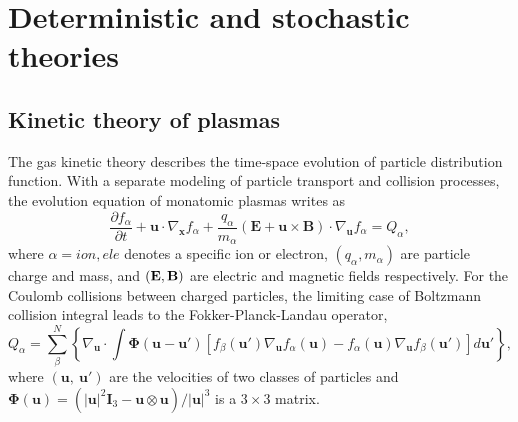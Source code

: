 \documentclass[preprint,3p,12pt,sort&compress]{elsarticle}
\begin{document}
\section{Deterministic and stochastic theories}\label{sec:kinetic theory}

\subsection{Kinetic theory of plasmas}

The gas kinetic theory describes the time-space evolution of particle distribution function.
With a separate modeling of particle transport and collision processes, the evolution equation of monatomic plasmas writes as
\begin{equation}
\frac{\partial f_{\alpha}}{\partial t}+\mathbf{u} \cdot \nabla_{\mathbf{x}} f_{\alpha}+\frac{q_{\alpha}}{m_{\alpha}}\left(\mathbf{E}+\mathbf{u} \times \mathbf{B}\right) \cdot \nabla_{\mathbf{u}} f_{\alpha}=Q_{\alpha},
\label{eqn:boltzmann}
\end{equation}
where $\alpha = ion,ele$ denotes a specific ion or electron, $(q_\alpha, m_\alpha)$ are particle charge and mass, and $(\bf E, B)$ are electric and magnetic fields respectively.
For the Coulomb collisions between charged particles, the limiting case of Boltzmann collision integral leads to the Fokker-Planck-Landau operator,
\begin{equation}
Q_\alpha = \sum_\beta^N \left\{ \nabla_\mathbf u \cdot \int \mathbf \Phi(\mathbf u - \mathbf u') \left[ f_\beta(\mathbf u') \nabla_\mathbf u f_\alpha(\mathbf u) - f_\alpha(\mathbf u) \nabla_\mathbf u f_\beta(\mathbf u') \right] d\mathbf u' \right\},
\label{eqn:fokker-planck collision operator}
\end{equation}
where $(\mathbf{u},\ \mathbf{u}')$ are the velocities of two classes of particles and $\mathbf \Phi(\mathbf u) = (|\mathbf u|^2 \mathbf I_3-\mathbf u \otimes \mathbf u)/|\mathbf u|^3$ is a $3\times3$ matrix.
\end{document}
